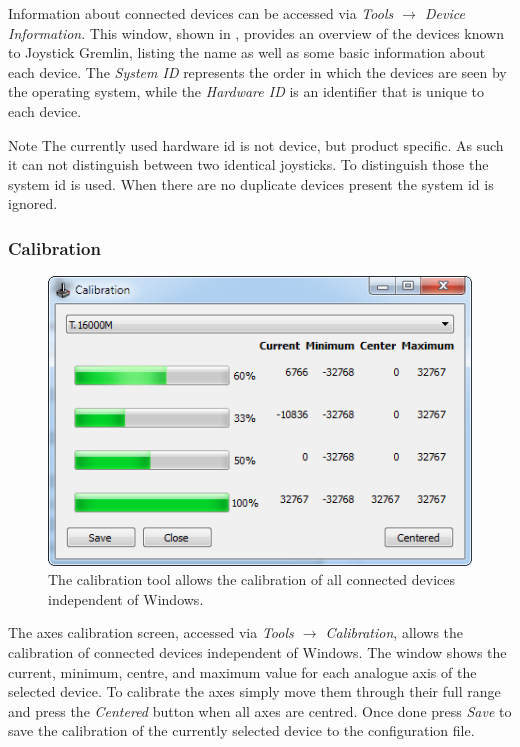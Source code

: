 \documentclass[a4, 10pt]{article}
\newcommand{\JG}{Joystick Gremlin}
\begin{document}
Information about connected devices can be accessed via \emph{Tools
$\rightarrow$ Device Information}. This window, shown in
, provides an overview of the devices known
to \JG{}, listing the name as well as some basic information about each
device. The \emph{System ID} represents the order in which the devices
are seen by the operating system, while the \emph{Hardware ID} is an
identifier that is unique to each device.

\vspace{1em}
\begin{bclogo}[
    couleur=yellow!40,
    couleurBord=orange!80,
    couleurBarre=orange!80,
    arrondi=0.1,
    logo=\bcinfo
]{Note}
    The currently used hardware id is not device, but product specific.
    As such it can not distinguish between two identical joysticks. To
    distinguish those the system id is used. When there are no duplicate
    devices present the system id is ignored.
\end{bclogo}


\subsubsection{Calibration}

\begin{figure}[bt]
    \centering

    \includegraphics[width=0.6\linewidth]{images/calibration}
    \caption{The calibration tool allows the calibration of all
    connected devices independent of Windows.}
    \label{fig:calibration}
\end{figure}

The axes calibration screen,  accessed via
\emph{Tools $\rightarrow$ Calibration}, allows the calibration of
connected devices independent of Windows. The window shows the current,
minimum, centre, and maximum value for each analogue axis of the
selected device. To calibrate the axes simply move them through their
full range and press the \emph{Centered} button when all axes are
centred. Once done press \emph{Save} to save the calibration of the
currently selected device to the configuration file.
\end{document}

